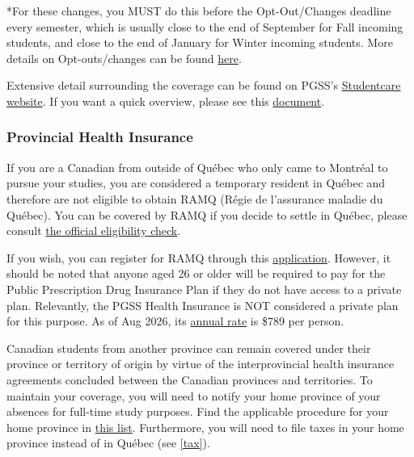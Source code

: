     *For these changes, you MUST do this before the Opt-Out/Changes deadline every semester, which is usually close to the end of September for Fall incoming students, and close to the end of January for Winter incoming students. More details on Opt-outs/changes can be found \href{https://www.studentcare.ca/rte/en/McGillUniversitygraduatestudentsPGSS_ChangeofCoverage_OptOuts}{here}.
    
    Extensive detail surrounding the coverage can be found on PGSS's \href{https://studentcare.ca/rte/en/McGillUniversitygraduatestudentsPGSS_Home}{Studentcare website}. If you want a quick overview, please see this \href{https://pgss.mcgill.ca/document/view/10773/PGSS%20Studentcare%20Health%20and%20Dental%20Insurance%20Presentation.pdf}{document}.

    \subsubsection{Provincial Health Insurance} 
    If you are a Canadian from outside of Québec who only came to Montréal to pursue your studies, you are considered a temporary resident in Québec and therefore are not eligible to obtain RAMQ (Régie de l'assurance maladie du Québec). You can be covered by RAMQ if you decide to settle in Québec, please consult \href{https://www.ramq.gouv.qc.ca/en/citizens/health-insurance/register}{the official eligibility check}. 

    If you wish, you can register for RAMQ through this \href{https://www.ramq.gouv.qc.ca/en/citizens/health-insurance/registration-information}{application}. However, it should be noted that anyone aged 26 or older will be required to pay for the Public Prescription Drug Insurance Plan if they do not have access to a private plan. Relevantly, the PGSS Health Insurance is NOT considered a private plan for this purpose. As of Aug 2026, its \href{https://www.ramq.gouv.qc.ca/en/citizens/prescription-drug-insurance/annual-premium}{annual rate} is \$789 per person.
    
    Canadian students from another province can remain covered under their province or territory of origin by virtue of the interprovincial health insurance agreements concluded between the Canadian provinces and territories. To maintain your coverage, you will need to notify your home province of your absences for full-time study purposes. Find the applicable procedure for your home province in \href{https://pgss.mcgill.ca/en/ramq-_-provincial-health-insurance}{this list}. Furthermore, you will need to file taxes in your home province instead of in Québec (see \hyperref[tax]{\textcolor{purble}{\ref*{tax}}}).

